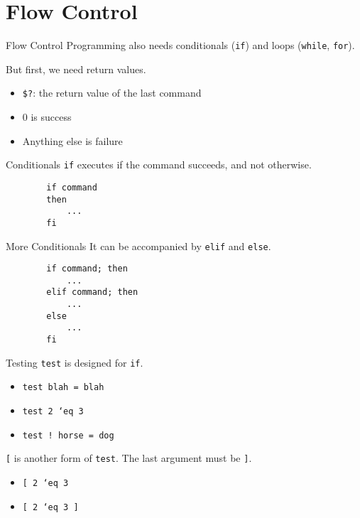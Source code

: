 \documentclass[pdf,usenames,dvipsnames,14pt]{beamer}%
\newcommand\hyphen{\char`\-}
\begin{document}
\section{Flow Control}

\begin{frame}{Flow Control}
	Programming also needs conditionals (\texttt{if}) and loops (\texttt{while}, \texttt{for}).
	
	But first, we need return values.
	\begin{itemize}
		\item \texttt{\$?}: the return value of the last command
		\item 0 is success
		\item Anything else is failure
	\end{itemize}
\end{frame}

\begin{frame}[fragile]{Conditionals}
	\texttt{if} executes if the command succeeds, and not otherwise.
	\begin{verbatim}
		if command
		then
		    ...
		fi
	\end{verbatim}
\end{frame}

\begin{frame}[fragile]{More Conditionals}
	It can be accompanied by \texttt{elif} and \texttt{else}.
	\begin{verbatim}
		if command; then
		    ...
		elif command; then
		    ...
		else
		    ...
		fi
	\end{verbatim}
\end{frame}

\begin{frame}{Testing}
	\texttt{test} is designed for \texttt{if}.
	\begin{itemize}
		\item \texttt{test blah = blah}
		\item \texttt{test 2 \hyphen eq 3}
		\item \texttt{test ! horse = dog}
	\end{itemize}
	
	\texttt{[} is another form of \texttt{test}. The last argument must be \texttt{]}.
	\begin{itemize}
		\item \texttt{[ 2 \hyphen eq 3}
		\item \texttt{[ 2 \hyphen eq 3 ]}
	\end{itemize}
\end{frame}
\end{document}
